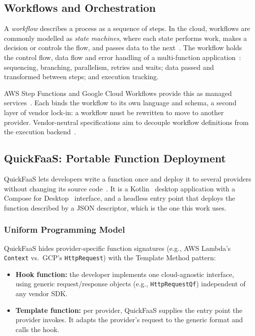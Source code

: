 \subsection{Workflows and Orchestration}
\label{sec:workflows}

A \textit{workflow} describes a process as a sequence of steps. In the cloud, workflows are
commonly modelled as \textit{state machines}, where each state performs work, makes a decision or
controls the flow, and passes data to the next~\cite{aws_stepfunctions_concepts}. The workflow
holds the control flow, data flow and error handling of a multi-function
application~\cite{sebsflow_arxiv,aws_stepfunctions_concepts}: sequencing, branching, parallelism,
retries and waits; data passed and transformed between steps; and execution tracking.

AWS Step Functions and Google Cloud Workflows provide this as managed
services~\cite{aws_stepfunctions_concepts,gcp_workflows_overview}. Each binds the workflow to its
own language and schema, a second layer of vendor lock-in: a workflow must be rewritten to move to
another provider. Vendor-neutral specifications aim to decouple workflow definitions from the
execution backend~\cite{serverlessWorkflowSpec}.

\subsection{QuickFaaS: Portable Function Deployment}
\label{sec:background_quickfaas}
QuickFaaS lets developers write a function once and deploy it to several providers without
changing its source code~\cite{rodrigues2022quickfaas}. It is a Kotlin~\cite{kotlin_lang} desktop
application with a Compose for Desktop~\cite{compose_multiplatform} interface, and a headless entry
point that deploys the function described by a JSON descriptor, which is the one this work uses.

\subsubsection{Uniform Programming Model}
QuickFaaS hides provider-specific function signatures (e.g., AWS Lambda's \texttt{Context} vs.\
GCP's \texttt{HttpRequest}) with the Template Method pattern:

\begin{itemize}
	\item \textbf{Hook function:} the developer implements one cloud-agnostic interface, using
	generic request/response objects (e.g., \texttt{HttpRequestQf}) independent of any vendor SDK.
	\item \textbf{Template function:} per provider, QuickFaaS supplies the entry point the provider
	invokes. It adapts the provider's request to the generic format and calls the hook.
\end{itemize}

